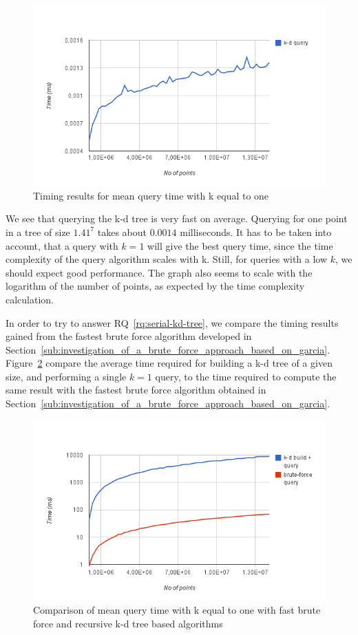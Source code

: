 \begin{figure}[ht!]
    \centering
    \includegraphics[width=120mm]{../gfx/serial-query.png}
    \caption{Timing results for mean query time with k equal to one}
    \label{fig:serial-query}
\end{figure}

We see that querying the k-d tree is very fast on average. Querying for one point in a tree of size $1.41^7$ takes about $0.0014$ milliseconds. It has to be taken into account, that a query with $k=1$ will give the best query time, since the time complexity of the query algorithm scales with k. Still, for queries with a low $k$, we should expect good performance. The graph also seems to scale with the logarithm of the number of points, as expected by the time complexity calculation.

In order to try to answer RQ~\ref{rq:serial-kd-tree}, we compare the timing results gained from the fastest brute force algorithm developed in Section~\ref{sub:investigation_of_a_brute_force_approach_based_on_garcia}. Figure~\ref{fig:brute-force-vs-serial-build-query} compare the average time required for building a k-d tree of a given size, and performing a single $k=1$ query, to the time required to compute the same result with the fastest brute force algorithm obtained in Section~\ref{sub:investigation_of_a_brute_force_approach_based_on_garcia}.

\begin{figure}[ht!]
\centering
\includegraphics[width=120mm]{../gfx/brute-force-vs-serial-build-query.png}
\caption{Comparison of mean query time with k equal to one with fast brute force and recursive k-d tree based algorithms}
\label{fig:brute-force-vs-serial-build-query}
\end{figure}

